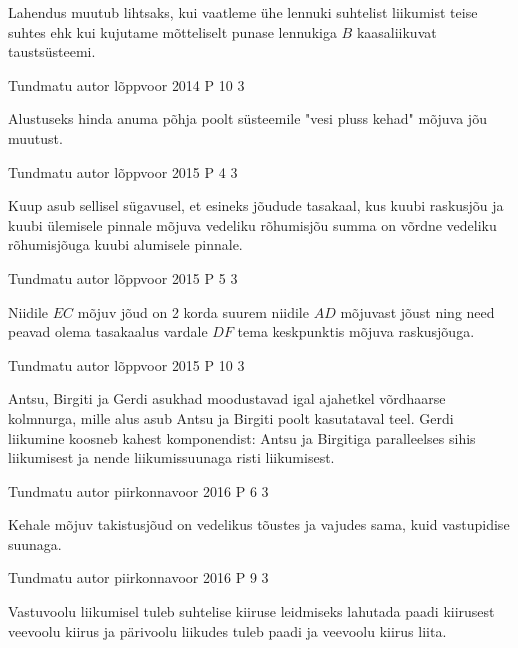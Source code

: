 \documentclass[11pt]{article}
\begin{document}
{{\ifHint
Lahendus muutub lihtsaks, kui vaatleme ühe lennuki suhtelist liikumist teise suhtes ehk kui kujutame mõtteliselt punase lennukiga $B$ kaasaliikuvat taustsüsteemi.
\fi
}

{Tundmatu autor} %
{lõppvoor} %
{2014} %
{P 10} %
{3} %
{

\ifHint
Alustuseks hinda anuma põhja poolt süsteemile "vesi pluss kehad" mõjuva jõu muutust. 
\fi
}

{Tundmatu autor} %
{lõppvoor} %
{2015} %
{P 4} %
{3} %
{

\ifHint
Kuup asub sellisel sügavusel, et esineks jõudude tasakaal, kus kuubi raskusjõu ja kuubi ülemisele pinnale mõjuva vedeliku rõhumisjõu summa on võrdne vedeliku rõhumisjõuga kuubi alumisele pinnale.
\fi
}

{Tundmatu autor} %
{lõppvoor} %
{2015} %
{P 5} %
{3} %
{

\ifHint
Niidile $EC$ mõjuv jõud on 2 korda suurem niidile $AD$ mõjuvast jõust ning need peavad olema tasakaalus vardale $DF$ tema keskpunktis mõjuva raskusjõuga.
\fi
}

{Tundmatu autor} %
{lõppvoor} %
{2015} %
{P 10} %
{3} %
{

\ifHint
Antsu, Birgiti ja Gerdi asukhad moodustavad igal ajahetkel võrdhaarse kolmnurga, mille alus asub Antsu ja Birgiti poolt kasutataval teel. Gerdi liikumine koosneb kahest komponendist: Antsu ja Birgitiga paralleelses sihis liikumisest ja nende liikumissuunaga risti liikumisest.
\fi
}

{Tundmatu autor} %
{piirkonnavoor} %
{2016} %
{P 6} %
{3} %
{

\ifHint
Kehale mõjuv takistusjõud on vedelikus tõustes ja vajudes sama, kuid vastupidise suunaga.
\fi
}

{Tundmatu autor} %
{piirkonnavoor} %
{2016} %
{P 9} %
{3} %
{

\ifHint
Vastuvoolu liikumisel tuleb suhtelise kiiruse leidmiseks lahutada paadi kiirusest veevoolu kiirus ja pärivoolu liikudes tuleb paadi ja veevoolu kiirus liita.
\fi
}

}
\end{document}
